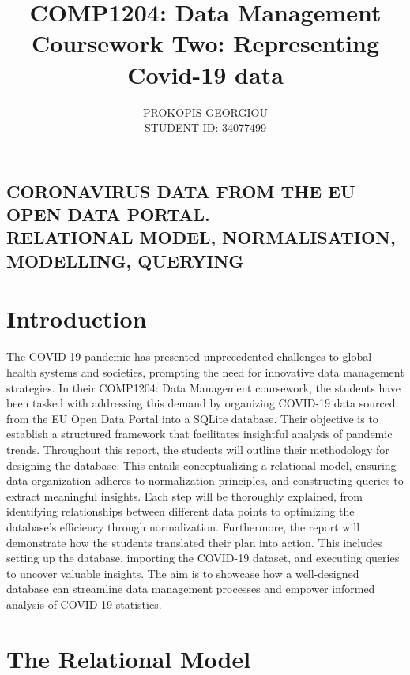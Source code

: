 \documentclass{article}
\begin{document}
\title{COMP1204: Data Management \\ Coursework Two: Representing Covid-19 data }
\author{PROKOPIS GEORGIOU\\STUDENT ID: 34077499}
\date{}
\maketitle

\begin{center}
   \section*{CORONAVIRUS DATA FROM THE EU OPEN DATA PORTAL.\\RELATIONAL MODEL, NORMALISATION, MODELLING, QUERYING} 
\end{center}
\vspace{2cm}

\section*{Introduction}

The COVID-19 pandemic has presented unprecedented challenges to global health systems and societies, prompting the need for innovative data management strategies. In their COMP1204: Data Management coursework, the students have been tasked with addressing this demand by organizing COVID-19 data sourced from the EU Open Data Portal into a SQLite database. Their objective is to establish a structured framework that facilitates insightful analysis of pandemic trends. Throughout this report, the students will outline their methodology for designing the database. This entails conceptualizing a relational model, ensuring data organization adheres to normalization principles, and constructing queries to extract meaningful insights. Each step will be thoroughly explained, from identifying relationships between different data points to optimizing the database's efficiency through normalization. Furthermore, the report will demonstrate how the students translated their plan into action. This includes setting up the database, importing the COVID-19 dataset, and executing queries to uncover valuable insights. The aim is to showcase how a well-designed database can streamline data management processes and empower informed analysis of COVID-19 statistics.


\section{The Relational Model}
\end{document}
